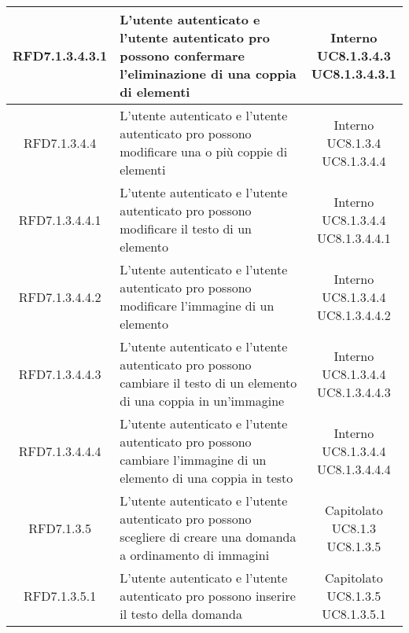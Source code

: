 \begin{longtable}{|c|>{\centering}m{7cm}|c|}
			 \hypertarget{{RFD7.1.3.4.3.1}}{{RFD7.1.3.4.3.1}} & L’utente autenticato e l'utente autenticato pro possono confermare l'eliminazione di una coppia di elementi & \makecell{Interno\\ UC8.1.3.4.3 \\UC8.1.3.4.3.1 } \\ \hline
			 \hypertarget{{RFD7.1.3.4.4}}{{RFD7.1.3.4.4}} & L’utente autenticato e l'utente autenticato pro possono modificare una o più coppie di elementi & \makecell{Interno\\ UC8.1.3.4 \\UC8.1.3.4.4 } \\ \hline
			 \hypertarget{{RFD7.1.3.4.4.1}}{{RFD7.1.3.4.4.1}} & L’utente autenticato e l'utente autenticato pro possono modificare il testo di un elemento & \makecell{Interno\\ UC8.1.3.4.4 \\UC8.1.3.4.4.1 } \\ \hline
			 \hypertarget{{RFD7.1.3.4.4.2}}{{RFD7.1.3.4.4.2}} & L’utente autenticato e l'utente autenticato pro possono modificare l’immagine di un elemento & \makecell{Interno\\ UC8.1.3.4.4 \\UC8.1.3.4.4.2 } \\ \hline
			 \hypertarget{{RFD7.1.3.4.4.3}}{{RFD7.1.3.4.4.3}} & L’utente autenticato e l'utente autenticato pro possono cambiare il testo di un elemento di una coppia in un’immagine & \makecell{Interno\\ UC8.1.3.4.4 \\UC8.1.3.4.4.3 } \\ \hline
			 \hypertarget{{RFD7.1.3.4.4.4}}{{RFD7.1.3.4.4.4}} & L’utente autenticato e l'utente autenticato pro possono cambiare l’immagine di un elemento di una coppia in testo & \makecell{Interno\\ UC8.1.3.4.4 \\UC8.1.3.4.4.4 } \\ \hline
			 \hypertarget{{RFD7.1.3.5}}{{RFD7.1.3.5}} & L’utente autenticato e l’utente autenticato pro possono scegliere di creare una domanda a ordinamento di immagini  & \makecell{Capitolato\\ UC8.1.3 \\UC8.1.3.5 } \\ \hline
			 \hypertarget{{RFD7.1.3.5.1}}{{RFD7.1.3.5.1}} & L’utente autenticato e l’utente autenticato pro possono inserire il testo della domanda & \makecell{Capitolato\\ UC8.1.3.5 \\UC8.1.3.5.1 } \\ \hline

\end{longtable}
